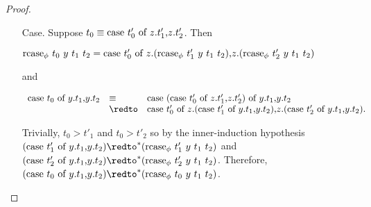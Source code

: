 \begin{proof}
\begin{itemize}
\begin{itemize}
  \item[Case.] Suppose $t_0 \equiv \mbox{case}\ t'_0\ \text{of}\ z\text{.}t'_1\text{,}z\text{.}t'_2$.  Then 
    \begin{center}
      \begin{math}
        \mbox{rcase}_{\phi}\ t_0\ y\ t_1\ t_2 = 
        \mbox{case}\ t'_0\ \text{of}\ z\text{.}(\mbox{rcase}_{\phi}\ t'_1\ y\ t_1\ t_2)\text{,}z\text{.}(\mbox{rcase}_{\phi}\ t'_2\ y\ t_1\ t_2)
      \end{math}
    \end{center}
    and
    \begin{center}
      \begin{math}
        \begin{array}{lll}
          \ccon{t_0}{y}{t_1}{t_2} & \equiv & \ccon{(\ccon{t'_0}{z}{t'_1}{t'_2})}{y}{t_1}{t_2}\\
          & \redto & \ccon{t'_0}{z}{(\ccon{t'_1}{y}{t_1}{t_2})}{(\ccon{t'_2}{y}{t_1}{t_2})}.
        \end{array}
      \end{math}
    \end{center}
    Trivially, $t_0 > t'_1$ and $t_0 > t'_2$ so by the inner-induction hypothesis 
    $(\ccon{t'_1}{y}{t_1}{t_2}) \redto^* (\rcase{\phi}{t'_1}{y}{t_1}{t_2})$ and 
    $(\ccon{t'_2}{y}{t_1}{t_2}) \redto^* (\rcase{\phi}{t'_2}{y}{t_1}{t_2})$.  Therefore,\\
    $(\ccon{t_0}{y}{t_1}{t_2}) \redto^* (\rcase{\phi}{t_0}{y}{t_1}{t_2})$.
  \end{itemize}
  

\end{itemize}
\end{proof}
